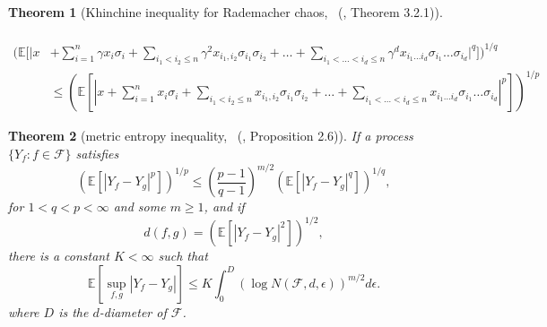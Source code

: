 \documentclass[letterpaper]{article} %
\def\DoubleColumnEnd{}
\def\SingleColumn{}
\def\SingleColumnEnd{}
\newtheorem{theorem}{Theorem}
\newcommand{\E}{\mathbb{E}}
\newcommand{\rademacher}{\sigma}
\newcommand{\citett}[2]{\citeauthor{#2}\ (\citeyear{#2}, #1)}
\begin{document}
\begin{theorem}[Khinchine inequality for Rademacher chaos, {\citett{Theorem 3.2.1}{de2012decoupling}}]
\begin{align*}
    \end{align*}
    \DoubleColumnEnd
    \SingleColumn
    \begin{align*}
        (\E[|x&+\sum_{i=1}^n \gamma x_i\rademacher_i+\sum_{i_1<i_2\le n}\gamma^2x_{i_1,i_2}\rademacher{}_{i_1}\rademacher{}_{i_2}+\dots+\sum_{i_1<\dots<i_d\le n}\gamma^dx_{i_1\dots i_d}\rademacher{}_{i_1}\dots \rademacher{}_{i_d}|^q])^{1/q}\\
        &\le (\E[|x+\sum_{i=1}^n x_i\rademacher_i+\sum_{i_1<i_2\le n}x_{i_1,i_2}\rademacher{}_{i_1}\rademacher{}_{i_2}+\dots+\sum_{i_1<\dots<i_d\le n}x_{i_1\dots i_d}\rademacher{}_{i_1}\dots \rademacher{}_{i_d}|^p])^{1/p}
    \end{align*}
    \SingleColumnEnd
\end{theorem}

\begin{theorem}[metric entropy inequality, {\citett{Proposition 2.6}{Dembo1994}}]
    \label{th:rademacher_process_chaining}
    If a process $\{Y_f: f\in\mathcal F\}$ satisfies
\begin{equation}
    \label{eq:kinchine_type_inequality_process}
    (\E[|Y_f-Y_g|^p])^{1/p}\le (\frac{p-1}{q-1})^{m/2}(\E[|Y_f-Y_g|^q])^{1/q},
\end{equation}
for $1<q<p<\infty$ and some $m\ge 1$, and if
\begin{equation}
    \label{eq:process_distance}
    d(f,g) = (\E[|Y_f-Y_g|^2])^{1/2},
\end{equation}
there is a constant $K<\infty$ such that
    \begin{equation}
        \label{eq:rademacher_process_chaining}
        \E[\sup_{f,g}|Y_f-Y_g|]\le K\int_0^D(\log N(\mathcal F,d,\epsilon))^{m/2}d\epsilon.
    \end{equation}
    where $D$ is the $d$-diameter of $\mathcal{F}$.
\end{theorem}
\end{document}
